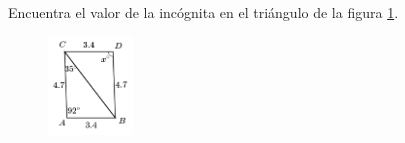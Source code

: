 \question[10]  Encuentra el valor de la incógnita en el triángulo de la figura \ref{fig:angle_triangle_04}.
\begin{figure}[H]
    \begin{center}
        \includegraphics[width=0.2\textwidth]{../images/angle_triangle_04.png}
    \end{center}
    \caption{}
    \label{fig:angle_triangle_04}
\end{figure}